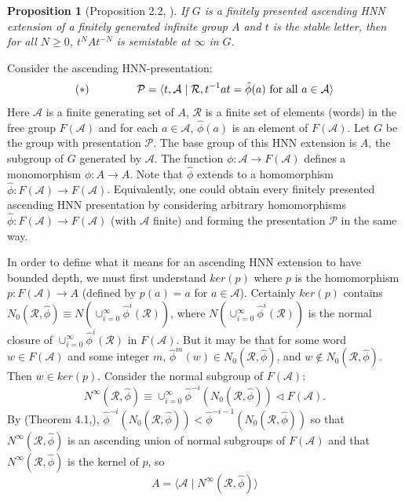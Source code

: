 \documentclass[12pt]{article}
\newtheorem{proposition}[theorem]{Proposition}
\begin{document}
\begin{proposition} [Proposition 2.2, \cite{M7}] \label{strongss}  
If $G$ is a finitely presented ascending HNN extension of a finitely generated infinite group $A$ and $t$ is the stable letter, then for all $N\geq 0$, $t^NAt^{-N}$ is  semistable at $\infty$ in $G$.
\end{proposition}

Consider the ascending HNN-presentation:
$$(\ast) \ \ \ \ \ \ \ \ \ \ \ \ \ \mathcal P=\langle t, \mathcal A\mid \mathcal R, t^{-1}at=\hat \phi(a)\hbox{ for all }a\in \mathcal A\rangle$$
Here $\mathcal A$ is a finite generating set of $A$, $\mathcal R$ is a finite set of elements (words) in the free group $F(\mathcal A)$ and for each $a\in \mathcal A$, $\hat \phi(a)$ is an element of  $F(\mathcal A)$. Let $G$ be the group with presentation $\mathcal P$. 
The base group of this HNN extension is $A$, the subgroup of $G$ generated by $\mathcal A$. The function $\phi:\mathcal A\to F(\mathcal A)$ defines a monomorphism $\phi:A\to A$.  Note that $\hat \phi$ extends to a homomorphism $\hat \phi:F(\mathcal A)\to F(\mathcal A)$. Equivalently, one could obtain every finitely presented ascending HNN presentation by considering arbitrary homomorphisms $\hat\phi:F(\mathcal A)\to F(\mathcal A)$ (with $\mathcal A$ finite) and forming the presentation $\mathcal P$ in the same way.

In order to define what it means for an ascending HNN extension to have bounded depth, we must first understand $ker(p)$ where $p$ is the homomorphism $p:F(\mathcal A)\to A$ (defined by $p(a)=a$ for $a\in \mathcal A$).  Certainly $ker(p)$ contains $N_0(\mathcal R,\hat \phi)\equiv N( \cup _{i=0}^\infty \hat \phi^i (\mathcal R))$, where $N( \cup _{i=0}^\infty \hat \phi^i (\mathcal R))$ is the normal closure of $ \cup _{i=0}^\infty \hat \phi^i (\mathcal R)$ in $F(\mathcal A)$. But it may be that for some word 
$w\in F(\mathcal A)$ and some integer $m$, $\hat \phi^m(w)\in N_0(\mathcal R,\hat \phi)$, and $w\not \in N_0(\mathcal R,\hat \phi)$. Then $w\in ker(p)$. Consider the normal subgroup of $F(\mathcal A)$: 
$$N^{\infty}(\mathcal R,\hat \phi)\equiv \cup _{i=0}^{\infty} \hat \phi^{-i}(N_0(\mathcal R,\hat \phi))\triangleleft F(\mathcal A).$$
 By  (Theorem 4.1,\cite{M7}),  $\hat \phi^{-i}(N_0(\mathcal R,\hat\phi))< \hat\phi^{-i-1}(N_0(\mathcal R,\hat\phi))$ so that  $N^{\infty}(\mathcal R,\hat\phi)$ is an ascending union of normal subgroups of $F(\mathcal A)$ and that $N^{\infty}(\mathcal R,\hat\phi)$ is the kernel of $p$, so 
$$A=\langle \mathcal A\mid N^{\infty}(\mathcal R,\hat\phi)\rangle$$ 
\end{document}
